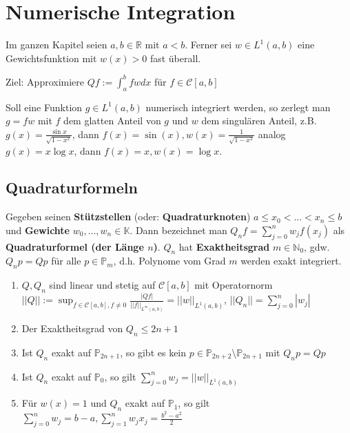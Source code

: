 \section{Numerische Integration}

Im ganzen Kapitel seien $a, b \in \mathbb{R}$ mit $a < b$. Ferner sei $w \in L^1(a, b)$ eine Gewichtsfunktion mit $w(x) > 0$ fast überall.

Ziel: Approximiere $Qf := \int_{a}^{b} fw dx$ für $f \in \mathcal{C}[a,b]$

\begin{remark}
	Soll eine Funktion $g \in L^1(a,b)$ numerisch integriert werden, so zerlegt man $g = fw$ mit $f$ dem glatten Anteil von $g$ und $w$ dem singulären Anteil, z.B. $g(x) = \frac{\sin x}{\sqrt{1-x^2}}$, dann $f(x) = \sin(x), w(x) = \frac{1}{\sqrt{1-x^2}}$ analog $g(x) = x\log x$, dann $f(x)=x, w(x)=\log x$.
\end{remark}

\subsection{Quadraturformeln}

\begin{definition}
	Gegeben seinen \textbf{Stützstellen} (oder: \textbf{Quadraturknoten}) $a \leq x_0 < ... < x_n \leq b$ und \textbf{Gewichte} $w_0, ..., w_n \in \mathbb{K}$. Dann bezeichnet man $Q_nf = \sum_{j=0}^{n} w_j f(x_j)$ als \textbf{Quadraturformel (der Länge $n$)}. $Q_n$ hat \textbf{Exaktheitsgrad} $m \in \mathbb{N}_0$, gdw. $Q_np = Qp$ für alle $p \in \mathbb{P}_m$, d.h. Polynome vom Grad $m$ werden exakt integriert.
\end{definition}

\begin{lemma}
	\begin{enumerate}
		\item $Q, Q_n$ sind linear und stetig auf $\mathcal{C}[a,b]$ mit Operatornorm $||Q|| := \sup_{f \in \mathcal{C}[a, b], f \neq 0} \frac{|Qf|}{||f||_{L^\infty(a,b)}} = ||w||_{L^1(a,b)}$, $||Q_n|| = \sum_{j=0}^{n} |w_j|$
		\item Der Exaktheitsgrad von $Q_n \leq 2n+1$
		\item Ist $Q_n$ exakt auf $\mathbb{P}_{2n+1}$, so gibt es kein $p \in \mathbb{P}_{2n+2}\setminus \mathbb{P}_{2n+1}$ mit $Q_np = Qp$
		\item Ist $Q_n$ exakt auf $\mathbb{P}_0$, so gilt $\sum_{j=0}^{n}w_j = ||w||_{L^1(a,b)}$
		\item Für $w(x) = 1$ und $Q_n$ exakt auf $\mathbb{P}_1$, so gilt $\sum_{j=0}^{n} w_j = b-a, \sum_{j=1}^{n} w_j x_j = \frac{b^2 - a^2}{2}$
	\end{enumerate}
\end{lemma}

